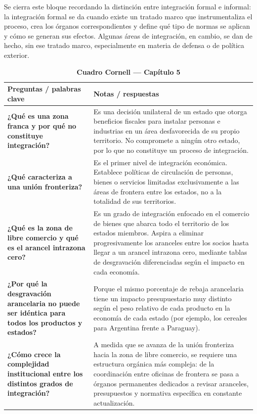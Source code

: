 \documentclass[12pt,oneside]{book}
\begin{document}
Se cierra este bloque recordando la distinción entre integración formal e informal: la integración formal se da cuando existe un tratado marco que instrumentaliza el proceso, crea los órganos correspondientes y define qué tipo de normas se aplican y cómo se generan sus efectos. Algunas áreas de integración, en cambio, se dan de hecho, sin ese tratado marco, especialmente en materia de defensa o de política exterior.

\begin{table}[H]
\centering
\caption*{\textbf{Cuadro Cornell --- Capítulo 5}}
\begin{tabularx}{\textwidth}{
    >{\raggedright\arraybackslash}p{}
    >{\raggedright\arraybackslash}X
}
\toprule
\textbf{Preguntas / palabras clave} &
\textbf{Notas / respuestas} \\
\midrule

\textbf{¿Qué es una zona franca y por qué no constituye integración?} &
Es una decisión unilateral de un estado que otorga beneficios fiscales para instalar personas e industrias en un área desfavorecida de su propio territorio. No compromete a ningún otro estado, por lo que no constituye un proceso de integración. \\

\textbf{¿Qué caracteriza a una unión fronteriza?} &
Es el primer nivel de integración económica. Establece políticas de circulación de personas, bienes o servicios limitadas exclusivamente a las áreas de frontera entre los estados, no a la totalidad de sus territorios. \\

\textbf{¿Qué es la zona de libre comercio y qué es el arancel intrazona cero?} &
Es un grado de integración enfocado en el comercio de bienes que abarca todo el territorio de los estados miembros. Aspira a eliminar progresivamente los aranceles entre los socios hasta llegar a un arancel intrazona cero, mediante tablas de desgravación diferenciadas según el impacto en cada economía. \\

\textbf{¿Por qué la desgravación arancelaria no puede ser idéntica para todos los productos y estados?} &
Porque el mismo porcentaje de rebaja arancelaria tiene un impacto presupuestario muy distinto según el peso relativo de cada producto en la economía de cada estado (por ejemplo, los cereales para Argentina frente a Paraguay). \\

\textbf{¿Cómo crece la complejidad institucional entre los distintos grados de integración?} &
A medida que se avanza de la unión fronteriza hacia la zona de libre comercio, se requiere una estructura orgánica más compleja: de la coordinación entre oficinas de frontera se pasa a órganos permanentes dedicados a revisar aranceles, presupuestos y normativa específica en constante actualización. \\


\end{tabularx}
\end{table}
\end{document}

